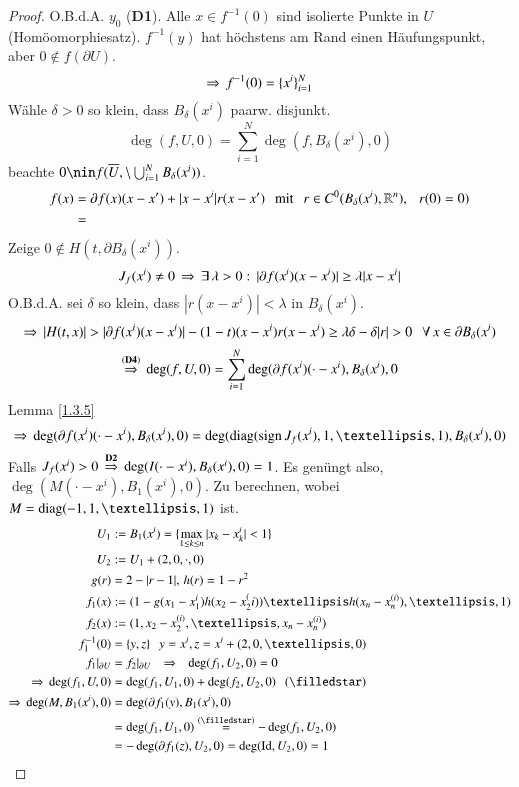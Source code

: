 \begin{proof}
    O.B.d.A. $y_0$ (\textbf{D1}). Alle $x\in f^{-1} (0)$ sind isolierte Punkte in $U$ (Homöomorphiesatz).
    $f^{-1}(y)$ hat höchstens am Rand einen Häufungspunkt, aber $0\nin f(\partial U)$.
    \[
        \Rightarrow \, f^{-1}(0)= \{ x^i \}_{i=1}^N
    \]
    Wähle $\delta >0$ so klein, dass $B_\delta(x^i)$ paarw. disjunkt.
    \[
        \deg(f,U,0)=\sum_{i=1}^N \deg(f,B_\delta(x^i),0)
    \]
    beachte $0\nin f(\ol U, \setminus \bigcup_{i=1}^N B_\delta(x^i))$.
    \begin{align*}
        f(x)&= \partial f(x)(x-x') + |x-x^i| r(x-x') \hspace{.25cm} \text{mit} \hspace{.25cm} r\in C^0(B_\delta(x^i),\mathbb{R}^n), 
        \hspace{.25cm} r(0)=0)\\
            &=
    \end{align*}
    Zeige $0\nin H(t,\partial B_\delta(x^i))$.
    \[
        J_f(x^i)\neq 0 \, \Rightarrow \, \exists\, \lambda >0:\, |\partial f(x^i)(x-x^i)|\geq \lambda|x-x^i|
    \]
    O.B.d.A. sei $\delta$ so klein, dass $|r(x-x^i)|<\lambda$ in $B_\delta (x^i)$.
    \[
        \Ra\, | H(t,x) |>|\partial f(x^i)(x-x^i)|-(1-t)(x-x^i)r(x-x^i)\geq \lambda \delta - \delta|r|>0
        \qq \forall \, x\in \partial B_\delta (x^i)
    \]
    \[
        \overset{(\textbf{D4})}{\Rightarrow} \, \deg(f,U,0)=\sum_{i=1}^N\deg (\partial f (x^i)(\cdot-x^i),
                B_\delta(x^i),0
    \]
    Lemma \ref{1.3.5}
    \[
        \Ra \, \deg(\partial f (x^i)(\cdot- x^i),B_\delta (x^i),0)= \deg(\diag(\sign J_f(x^i),1,…,1),
            B_\delta(x^i),0)
    \]
    Falls $J_f(x^i)>0\, \overset{\textbf{D2}}{\Rightarrow}\,\deg(I(\cdot-x^i),B_\delta (x^i),0)=1$. Es genüngt
    also, $\deg(M(\cdot-x^i),B_1(x^i),0)$. Zu berechnen, wobei $M=\diag(-1,1,…,1)$ ist.
    \begin{align*}
        U_1&:= B_1 (x^i) = \{ \max_{1\leq k\leq n} |x_k-x_k^i|<1 \}\\
        U_2&:= U_1+ (2,0,\cdot,0)\\
        g(r)&=2-|r-1|, \, h(r)=1-r^2\\
        f_1(x)&:= (1-g(x_1-x_1^i)h(x_2-x_2^(i))…h(x_n-x_n^{(i)}),…, 1)\\
        f_2(x)&:= (1,x_2-x_2^{(i)}, … , x_n-x_n^{(i)})\\
        f_1^{-1}(0)&= \{ y,z \} \qq y=x^i, z = x^i+(2,0,…,0)\\
        f_1|_{\partial U}&= f_2|_{\partial U} \qq \Ra \qq \deg(f_1,U_2,0)=0\\
        \Ra \, \deg (f_1,U,0)&= \deg(f_1,U_1,0)+ \deg(f_2,U_2,0) \qq (\star)\\
        \Ra \, \deg(M,B_1(x^i),0)&=\deg(\partial f_1(y),B_1(x^i), 0)\\
        &=\deg(f_1, U_1,0) \overset{(\star)}{=} -\deg (f_1,U_2,0)\\
        &= -\deg(\partial f_1(z),U_2,0)=\deg(\Id, U_2,0)=1
    \end{align*}
    \[ \]
\end{proof}
